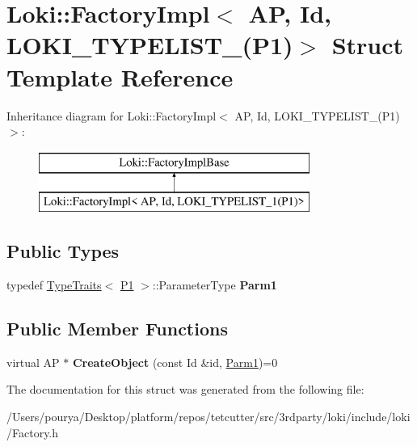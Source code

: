 \hypertarget{structLoki_1_1FactoryImpl_3_01AP_00_01Id_00_01LOKI__TYPELIST__1_07P1_08_4}{}\section{Loki\+:\+:Factory\+Impl$<$ A\+P, Id, L\+O\+K\+I\+\_\+\+T\+Y\+P\+E\+L\+I\+S\+T\+\_(P1)$>$ Struct Template Reference}
\label{structLoki_1_1FactoryImpl_3_01AP_00_01Id_00_01LOKI__TYPELIST__1_07P1_08_4}
Inheritance diagram for Loki\+:\+:Factory\+Impl$<$ A\+P, Id, L\+O\+K\+I\+\_\+\+T\+Y\+P\+E\+L\+I\+S\+T\+\_(P1)$>$\+:\begin{figure}[H]
\begin{center}
\leavevmode
\includegraphics[height=2.000000cm]{structLoki_1_1FactoryImpl_3_01AP_00_01Id_00_01LOKI__TYPELIST__1_07P1_08_4}
\end{center}
\end{figure}
\subsection*{Public Types}
\begin{DoxyCompactItemize}
\item 
\hypertarget{structLoki_1_1FactoryImpl_3_01AP_00_01Id_00_01LOKI__TYPELIST__1_07P1_08_4_a714ef954736fd7f559a3725b36f9a2ac}{}typedef \hyperlink{classLoki_1_1TypeTraits}{Type\+Traits}$<$ \hyperlink{structP1}{P1} $>$\+::Parameter\+Type {\bfseries Parm1}\label{structLoki_1_1FactoryImpl_3_01AP_00_01Id_00_01LOKI__TYPELIST__1_07P1_08_4_a714ef954736fd7f559a3725b36f9a2ac}

\end{DoxyCompactItemize}
\subsection*{Public Member Functions}
\begin{DoxyCompactItemize}
\item 
\hypertarget{structLoki_1_1FactoryImpl_3_01AP_00_01Id_00_01LOKI__TYPELIST__1_07P1_08_4_a7d5136297fdc808a6fca33b4cc680ed5}{}virtual A\+P $\ast$ {\bfseries Create\+Object} (const Id \&id, \hyperlink{classLoki_1_1EmptyType}{Parm1})=0\label{structLoki_1_1FactoryImpl_3_01AP_00_01Id_00_01LOKI__TYPELIST__1_07P1_08_4_a7d5136297fdc808a6fca33b4cc680ed5}

\end{DoxyCompactItemize}


The documentation for this struct was generated from the following file\+:\begin{DoxyCompactItemize}
\item 
/\+Users/pourya/\+Desktop/platform/repos/tetcutter/src/3rdparty/loki/include/loki/Factory.\+h\end{DoxyCompactItemize}
